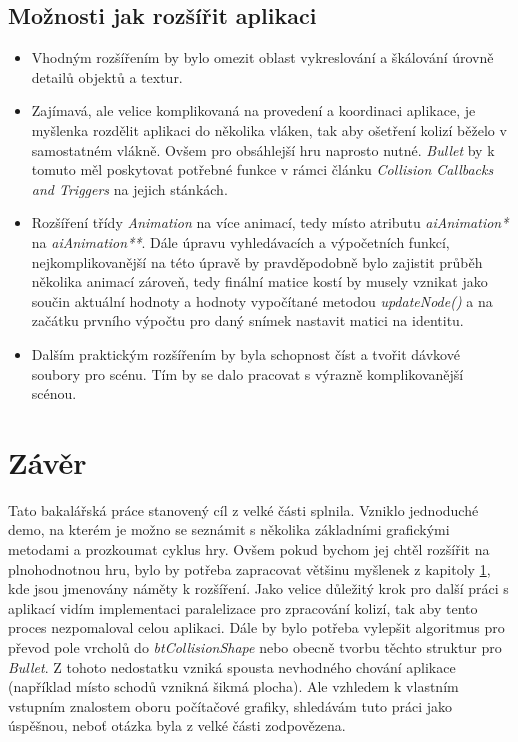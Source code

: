 \section{Možnosti jak rozšířit aplikaci}\label{extend} 
\begin{itemize}
	\item Vhodným rozšířením by bylo omezit oblast vykreslování a škálování úrovně detailů objektů a textur.
	\item 
	Zajímavá, ale velice komplikovaná na provedení a koordinaci aplikace, je myšlenka rozdělit aplikaci do několika vláken, tak aby ošetření kolizí běželo v samostatném vlákně. Ovšem pro obsáhlejší hru naprosto nutné. \emph{Bullet} by k tomuto měl poskytovat potřebné funkce v rámci článku \emph{Collision Callbacks and Triggers}\cite{bullet-trigger} na jejich stánkách.
	\item Rozšíření třídy \emph{Animation} na více animací, tedy místo atributu \emph{aiAnimation*} na \emph{aiAnimation**}. Dále úpravu vyhledávacích a výpočetních funkcí, nejkomplikovanější na této úpravě by pravděpodobně bylo zajistit průběh několika animací zároveň, tedy finální matice kostí by musely vznikat jako součin aktuální hodnoty a hodnoty vypočítané metodou \emph{updateNode()} a na začátku prvního výpočtu pro daný snímek nastavit matici na identitu.
	\item Dalším praktickým rozšířením by byla schopnost číst a tvořit dávkové soubory pro scénu. Tím by se dalo pracovat s výrazně komplikovanější scénou.
\end{itemize}

\chapter{Závěr}
Tato bakalářská práce stanovený cíl z velké části splnila. Vzniklo jednoduché demo, na kterém je možno se seznámit s několika základními grafickými metodami a prozkoumat cyklus hry. Ovšem pokud bychom jej chtěl rozšířit na plnohodnotnou hru, bylo by potřeba zapracovat většinu myšlenek z kapitoly \ref{extend}, kde jsou jmenovány náměty k rozšíření. Jako velice důležitý krok pro další práci s aplikací vidím implementaci paralelizace pro zpracování kolizí, tak aby tento proces nezpomaloval celou aplikaci. Dále by bylo potřeba vylepšit algoritmus pro převod pole vrcholů do \emph{btCollisionShape} nebo obecně tvorbu těchto struktur pro \emph{Bullet}. Z tohoto nedostatku vzniká spousta nevhodného chování aplikace (například místo schodů vznikná šikmá plocha). Ale vzhledem k vlastním vstupním znalostem oboru počítačové grafiky, shledávám tuto práci jako úspěšnou, neboť otázka  byla z velké části zodpovězena.     
